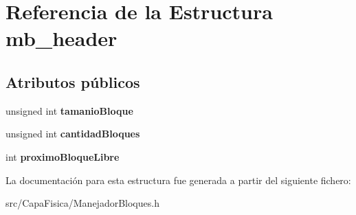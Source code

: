 \hypertarget{structmb__header}{\section{\-Referencia de la \-Estructura mb\-\_\-header}
\label{structmb__header}
}
\subsection*{\-Atributos públicos}
\begin{DoxyCompactItemize}
\item 
\hypertarget{structmb__header_aa3601159f380a4105ab28a9ebd31b8c8}{unsigned int {\bfseries tamanio\-Bloque}}\label{structmb__header_aa3601159f380a4105ab28a9ebd31b8c8}

\item 
\hypertarget{structmb__header_a9f3c62460f278ad7f2da6081c5840c20}{unsigned int {\bfseries cantidad\-Bloques}}\label{structmb__header_a9f3c62460f278ad7f2da6081c5840c20}

\item 
\hypertarget{structmb__header_a5642f8e9ed565d40448307b06a91ae1b}{int {\bfseries proximo\-Bloque\-Libre}}\label{structmb__header_a5642f8e9ed565d40448307b06a91ae1b}

\end{DoxyCompactItemize}


\-La documentación para esta estructura fue generada a partir del siguiente fichero\-:\begin{DoxyCompactItemize}
\item 
src/\-Capa\-Fisica/\-Manejador\-Bloques.\-h\end{DoxyCompactItemize}
